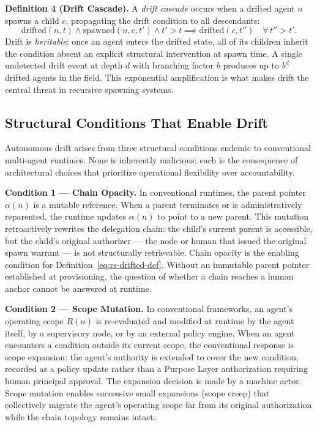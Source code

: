 \medskip
\noindent\textbf{Definition 4 (Drift Cascade).}
A \emph{drift cascade} occurs when a drifted agent $n$ spawns a child $c$, propagating the drift condition to all descendants:
\begin{equation}
\mathrm{drifted}(n, t) \land \mathrm{spawned}(n, c, t') \land t' > t \implies \mathrm{drifted}(c, t'')\quad \forall\, t'' > t'.
\label{eq:rs-drift-cascade}
\end{equation}
Drift is \emph{heritable}: once an agent enters the drifted state, all of its children inherit the condition absent an explicit structural intervention at spawn time. A single undetected drift event at depth $d$ with branching factor $b$ produces up to $b^d$ drifted agents in the field. This exponential amplification is what makes drift the central threat in recursive spawning systems.

\subsection{Structural Conditions That Enable Drift}
\label{sec:rs-drift-conditions}

Autonomous drift arises from three structural conditions endemic to conventional multi-agent runtimes. None is inherently malicious; each is the consequence of architectural choices that prioritize operational flexibility over accountability.

\medskip
\noindent\textbf{Condition 1 — Chain Opacity.}
In conventional runtimes, the parent pointer $\alpha(n)$ is a mutable reference. When a parent terminates or is administratively reparented, the runtime updates $\alpha(n)$ to point to a new parent. This mutation retroactively rewrites the delegation chain: the child's current parent is accessible, but the child's original authorizer — the node or human that issued the original spawn warrant — is not structurally retrievable. Chain opacity is the enabling condition for Definition~\ref{eq:rs-drifted-def}. Without an immutable parent pointer established at provisioning, the question of whether a chain reaches a human anchor cannot be answered at runtime.

\medskip
\noindent\textbf{Condition 2 — Scope Mutation.}
In conventional frameworks, an agent's operating scope $R(n)$ is re-evaluated and modified at runtime by the agent itself, by a supervisory node, or by an external policy engine. When an agent encounters a condition outside its current scope, the conventional response is scope expansion: the agent's authority is extended to cover the new condition, recorded as a policy update rather than a Purpose Layer authorization requiring human principal approval. The expansion decision is made by a machine actor. Scope mutation enables successive small expansions (scope creep) that collectively migrate the agent's operating scope far from its original authorization while the chain topology remains intact.

